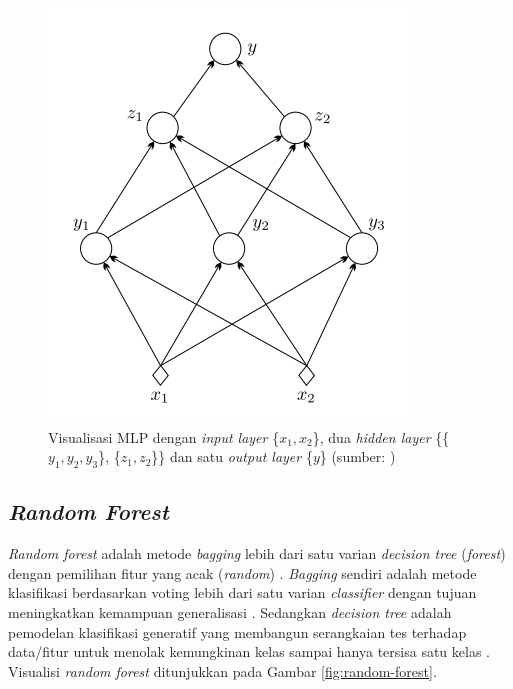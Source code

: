 \begin{figure}
\centering
\includegraphics[scale=0.5]{../images/mlp.png}
\caption{Visualisasi MLP dengan \textit{input layer} \{$x_1, x_2$\}, dua \textit{hidden layer} \{\{$y_1, y_2, y_3$\}, \{$z_1, z_2$\}\} dan satu \textit{output layer} \{$y$\} (sumber: \cite{theodoridis2015machine})}
\label{fig:mlp}
\end{figure}

\subsection{\textit{Random Forest}}

\textit{Random forest} adalah metode \textit{bagging} lebih dari satu varian \textit{decision tree} (\textit{forest}) dengan pemilihan fitur yang acak (\textit{random}) \citep{breiman2001random}. \textit{Bagging} sendiri adalah metode klasifikasi berdasarkan voting lebih dari satu varian \textit{classifier} dengan tujuan meningkatkan kemampuan generalisasi \citep{breiman1996bagging}. Sedangkan \textit{decision tree} adalah pemodelan klasifikasi generatif yang membangun serangkaian tes terhadap data/fitur untuk menolak kemungkinan kelas sampai hanya tersisa satu kelas \citep{theodoridis2015machine}. Visualisi \textit{random forest} ditunjukkan pada Gambar \ref{fig:random-forest}.

